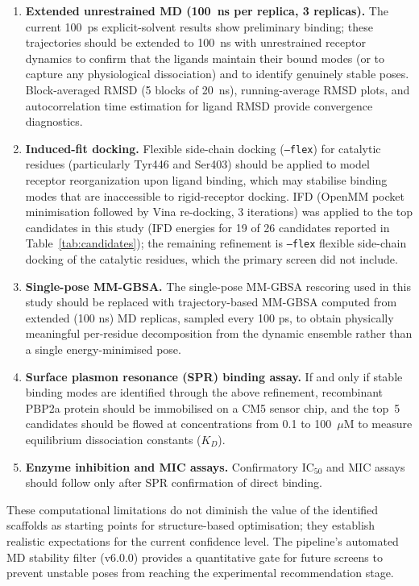 \documentclass[12pt]{article}
\begin{document}
\begin{enumerate}
    \item \textbf{Extended unrestrained MD (100~ns per replica, 3 replicas).} The current 100~ps explicit-solvent results show preliminary binding; these trajectories should be extended to 100~ns with unrestrained receptor dynamics to confirm that the ligands maintain their bound modes (or to capture any physiological dissociation) and to identify genuinely stable poses. Block-averaged RMSD (5 blocks of 20~ns), running-average RMSD plots, and autocorrelation time estimation for ligand RMSD provide convergence diagnostics.

    \item \textbf{Induced-fit docking.} Flexible side-chain docking (\texttt{--flex}) for catalytic residues (particularly Tyr446 and Ser403) should be applied to model receptor reorganization upon ligand binding, which may stabilise binding modes that are inaccessible to rigid-receptor docking. IFD (OpenMM pocket minimisation followed by Vina re-docking, 3 iterations) was applied to the top candidates in this study (IFD energies for 19 of 26 candidates reported in Table~\ref{tab:candidates}); the remaining refinement is \texttt{--flex} flexible side-chain docking of the catalytic residues, which the primary screen did not include.

    \item \textbf{Single-pose MM-GBSA.} The single-pose MM-GBSA rescoring used in this study should be replaced with trajectory-based MM-GBSA computed from extended (100 ns) MD replicas, sampled every 100 ps, to obtain physically meaningful per-residue decomposition from the dynamic ensemble rather than a single energy-minimised pose.

    \item \textbf{Surface plasmon resonance (SPR) binding assay.} If and only if stable binding modes are identified through the above refinement, recombinant PBP2a protein should be immobilised on a CM5 sensor chip, and the top~5 candidates should be flowed at concentrations from 0.1 to 100~$\mu$M to measure equilibrium dissociation constants ($K_D$).

    \item \textbf{Enzyme inhibition and MIC assays.} Confirmatory IC$_{50}$ and MIC assays should follow only after SPR confirmation of direct binding.
\end{enumerate}

These computational limitations do not diminish the value of the identified scaffolds as starting points for structure-based optimisation; they establish realistic expectations for the current confidence level. The pipeline's automated MD stability filter (v6.0.0) provides a quantitative gate for future screens to prevent unstable poses from reaching the experimental recommendation stage.
\end{document}
